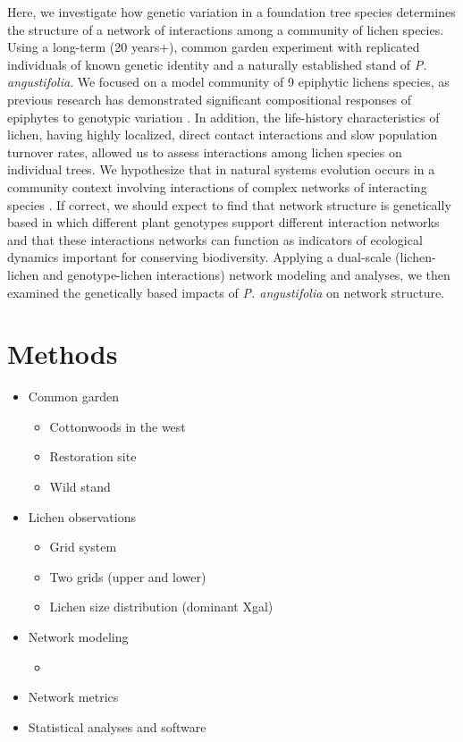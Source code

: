 \documentclass[fleqn,10pt]{wlscirep}
\begin{document}
Here, we investigate how genetic variation in a foundation tree
species determines the structure of a network of interactions among a
community of lichen species. Using a long-term (20 years+), common
garden experiment with replicated individuals of known genetic
identity and a naturally established stand of
\textit{P. angustifolia}. We focused on a model community of 9
epiphytic lichens species, as previous research has demonstrated
significant compositional responses of epiphytes to genotypic
variation \cite{Winfree2011, Zytynska2011}. In addition, the
life-history characteristics of lichen, having highly localized,
direct contact interactions and slow population turnover rates,
allowed us to assess interactions among lichen species on individual
trees. We hypothesize that in natural systems evolution occurs in a
community context involving interactions of complex networks of
interacting species \cite{Lau2016, Keith2017, Thompson2013,
  Bascompte2007, Darwin1855}.  If correct, we should expect to find
that network structure is genetically based in which different plant
genotypes support different interaction networks and that these
interactions networks can function as indicators of ecological
dynamics important for conserving biodiversity.  Applying a dual-scale
(lichen-lichen and genotype-lichen interactions) network modeling and
analyses, we then examined the genetically based impacts of
\textit{P. angustifolia} on network structure.


\section*{Methods}

\begin{itemize}
\item Common garden
  \begin{itemize}
  \item Cottonwoods in the west
  \item Restoration site
  \item Wild stand
  \end{itemize}
\item Lichen observations
  \begin{itemize}
  \item Grid system
  \item Two grids (upper and lower)
  \item Lichen size distribution (dominant Xgal)
  \end{itemize}
\item Network modeling
  \begin{itemize}
  \item 
  \end{itemize}
\item Network metrics
\item Statistical analyses and software
\end{itemize}
\end{document}
